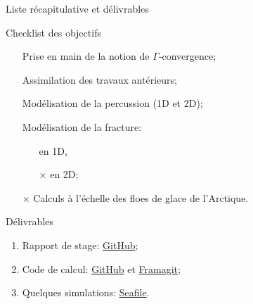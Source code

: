 \begin{frame}{Liste récapitulative et délivrables}

        \begin{block}{Checklist des objectifs}
    	\begin{enumerate}
      	\item[\checkmark] Prise en main de la notion de $\Gamma$‑convergence; \pause
      	\item[\checkmark] Assimilation des travaux antérieurs; \pause
      	\item[\checkmark] Modélisation de la percussion (1D et 2D); \pause
      	\item[\checkmark] Modélisation de la fracture: 
      	\begin{itemize}
        \item[\checkmark] en 1D,
        \item[$\times$] en 2D; 
        \end{itemize} \pause
      	\item[$\times$] Calculs à l'échelle des floes de glace de l'Arctique. 
      	\end{enumerate}
		\end{block}
	
        \pause
        \begin{exampleblock}{Délivrables}
        \begin{enumerate}
        \item Rapport de stage: \myemoji \textcolor{orange}{\href{https://github.com/desmond-rn/ice-floes/tree/master/pdf}{ GitHub}};
        \item Code de calcul: \myemoji \textcolor{orange}{\href{https://github.com/desmond-rn/ice-floes/tree/master/code}{ GitHub}} et \myemoji \textcolor{orange}{\href{https://framagit.org/RaK/SimuRessorts}{ Framagit}};
        \item Quelques simulations: \myemoji \textcolor{orange}{\href{https://seafile.unistra.fr/d/a6c3680909624b22be7c/}{ Seafile}}.
        \end{enumerate}
		\end{exampleblock}
    
\end{frame}
